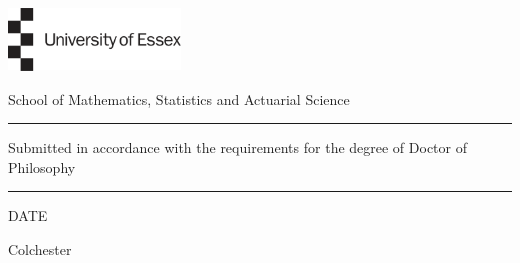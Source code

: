 \begin{titlepage}
	\thispagestyle{empty} %
	
	\noindent
	\begin{minipage}{0.1\textwidth}
		\includegraphics[height=4.5em]{essex.png}
	\end{minipage}
	\hfill
	\begin{minipage}{0.5\textwidth}
		\begin{center}
			\renewcommand\familydefault{\sfdefault}
			\selectfont
			{\large School of Mathematics, Statistics and Actuarial Science}
		\end{center}
	\end{minipage}
	
    \begin{center}
%        
        
        
        
            \noindent\textcolor{myred}{\rule{\linewidth}{4.8pt}}
        
        \vspace{3em}
        
        \vspace{3em}
        \vfill
        \noindent \Large{{Submitted in accordance with the requirements for the degree of
        		Doctor of Philosophy}}
        
        \vspace{0.5em}
        \noindent\textcolor{myred}{\rule{\linewidth}{4.8pt}}
        
        \vspace{2em}
        {\Large DATE}
        
        {\Large Colchester}
        
        
        
    \end{center}
\end{titlepage}
